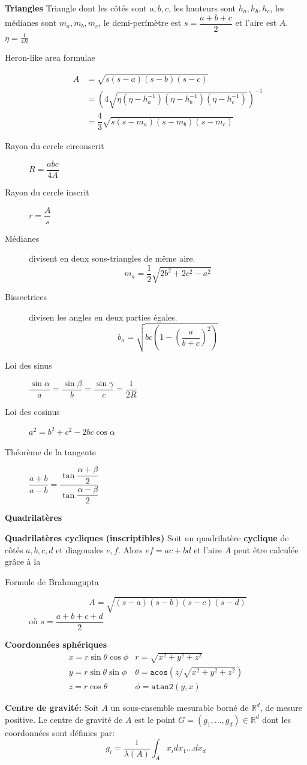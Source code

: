 \textbf{Triangles}
Triangle dont les côtés sont $a,b,c$, les hauteurs sont $h_a, h_b, h_c$, les médianes sont
 $m_a, m_b, m_c$, le demi-perímètre est $s = \dfrac{a + b + c}{2}$ et l'aire est $A$. $\eta=\frac{1}{4R}$\\

\begin{description}
	\item[Heron-like area formulae]
		\begin{align*} 
		A &= \sqrt{s(s-a)(s-b)(s-c)}\\
			&= \left( 4 \sqrt{\eta (\eta - h_a^{-1}) (\eta - h_b^{-1}) (\eta - h_c^{-1})} \right)^{-1} \\
			&= \dfrac{4}{3} \sqrt{s(s - m_a)(s - m_b)(s - m_c)}
		\end{align*}
	\item[Rayon du cercle circonscrit] $R = \dfrac{abc}{4A}$
	\item[Rayon du cercle inscrit] $r=\dfrac{A}{s}$
	\item[Médianes] divisent en deux sous-triangles de même aire.
		\[ m_a=\dfrac{1}{2}\sqrt{2b^2 + 2c^2 - a^2} \]
	\item[Bissectrices] divisen les angles en deux parties égales.
		\[ b_a=\sqrt{bc\left(1-\left(\dfrac{a}{b+c}\right)^2\right)}\]
	\item[Loi des sinus]
	$ \dfrac{\sin\alpha}{a}=\dfrac{\sin\beta}{b}=\dfrac{\sin\gamma}{c}=\dfrac{1}{2R}$
	\item[Loi des cosinus]
	$ a^2=b^2+c^2-2bc\cos\alpha $
	\item[Théorème de la tangente]
	$ \dfrac{a+b}{a-b}=\dfrac{\tan\dfrac{\alpha+\beta}{2}}{\tan\dfrac{\alpha-\beta}{2}} $
\end{description}

\textbf{Quadrilatères}

\textbf{Quadrilatères cycliques (inscriptibles)}
Soit un quadrilatère \textbf{cyclique} de côtés $a, b, c, d$ et diagonales $e, f$. Alors $ef = ac + bd$ et l'aire $A$ peut être calculée grâce à la

\begin{description}
	\item[Formule de Brahmagupta]
	\[A = \sqrt{(s - a)(s - b)(s - c)(s - d)}\]
	où $s = \dfrac{a + b + c + d}{2}$
\end{description}

\textbf{Coordonnées sphériques}
\[\begin{array}{cc}
x = r\sin\theta\cos\phi & r = \sqrt{x^2+y^2+z^2}\\
y = r\sin\theta\sin\phi & \theta = \texttt{acos}(z/\sqrt{x^2+y^2+z^2})\\
z = r\cos\theta & \phi = \texttt{atan2}(y,x)
\end{array}\]

\textbf{Centre de gravité:}
Soit $A$ un sous-ensemble mesurable borné de $\mathbb{R}^d$, de mesure positive. Le centre de
gravité de $A$ est le point $G = (g_1, . . . , g_d) \in \mathbb{R}^d$ dont les coordonnées sont 
définies par:
\[ 
	g_i = \frac{1}{\lambda(A)} \int_A x_i dx_1 \ldots dx_d
\]